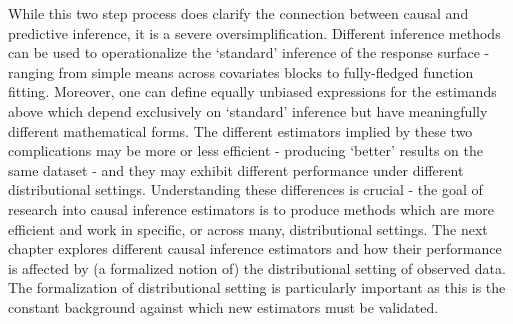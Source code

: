 \documentclass[../main.tex]{subfiles}
\begin{document}
\vspace{\baselineskip}
While this two step process does clarify the connection between causal and predictive inference, it is a severe oversimplification. Different inference methods can be used to operationalize the ‘standard’ inference of the response surface - ranging from simple means across covariates blocks to fully-fledged function fitting. Moreover, one can define equally unbiased expressions for the estimands above which depend exclusively on ‘standard’ inference but have meaningfully different mathematical forms. The different estimators implied by these two complications may be more or less efficient - producing ‘better’ results on the same dataset - and they may exhibit different performance under different distributional settings. Understanding these differences is crucial - the goal of research into causal inference estimators is to produce methods which are more efficient and work in specific, or across many, distributional settings. The next chapter explores different causal inference estimators and how their performance is affected by (a formalized notion of) the distributional setting of observed data. The formalization of distributional setting is particularly important as this is the constant background against which new estimators must be validated.\par
\end{document}
